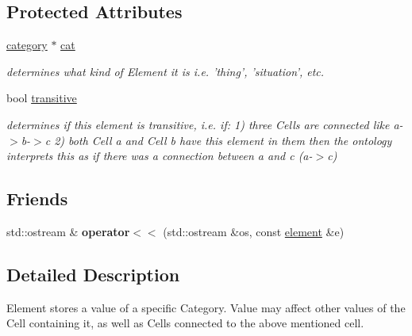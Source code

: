 \subsection*{\-Protected \-Attributes}
\begin{DoxyCompactItemize}
\item 
\hypertarget{classmbdev__ontology_1_1element_a90da561e20a92103b33e879e78032e0a}{\hyperlink{classmbdev__ontology_1_1category}{category} $\ast$ \hyperlink{classmbdev__ontology_1_1element_a90da561e20a92103b33e879e78032e0a}{cat}}\label{classmbdev__ontology_1_1element_a90da561e20a92103b33e879e78032e0a}

\begin{DoxyCompactList}\small\item\em determines what kind of \-Element it is i.\-e. 'thing', 'situation', etc. \end{DoxyCompactList}\item 
bool \hyperlink{classmbdev__ontology_1_1element_a2dd58a46bab19cdf0c243bcd84c23fdb}{transitive}
\begin{DoxyCompactList}\small\item\em determines if this element is transitive, i.\-e. if\-: 1) three \-Cells are connected like a-\/$>$b-\/$>$c 2) both \-Cell a and \-Cell b have this element in them then the ontology interprets this as if there was a connection between a and c (a-\/$>$c) \end{DoxyCompactList}\end{DoxyCompactItemize}
\subsection*{\-Friends}
\begin{DoxyCompactItemize}
\item 
\hypertarget{classmbdev__ontology_1_1element_aec34156b3910eda665d18dcfe5e2cfe5}{std\-::ostream \& {\bfseries operator$<$$<$} (std\-::ostream \&os, const \hyperlink{classmbdev__ontology_1_1element}{element} \&e)}\label{classmbdev__ontology_1_1element_aec34156b3910eda665d18dcfe5e2cfe5}

\end{DoxyCompactItemize}


\subsection{\-Detailed \-Description}
\-Element stores a value of a specific \-Category. \-Value may affect other values of the \-Cell containing it, as well as \-Cells connected to the above mentioned cell. 

